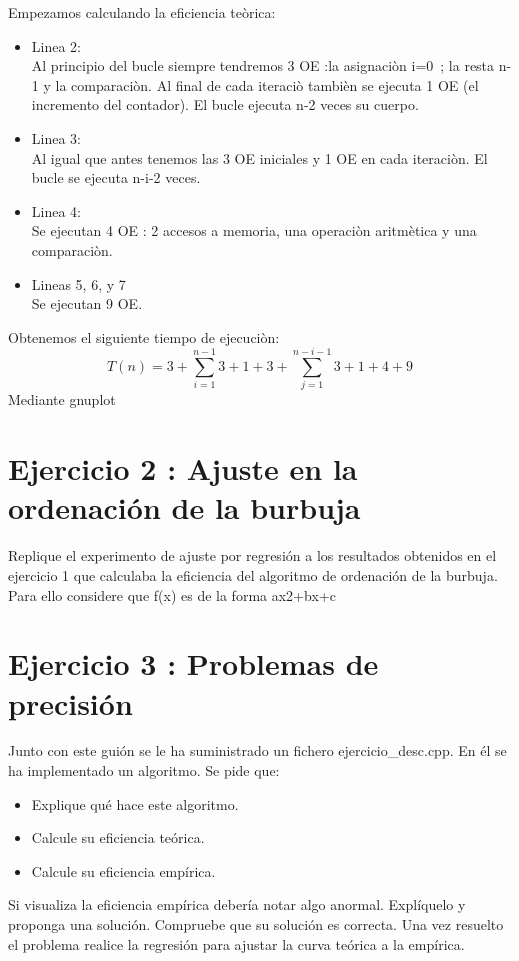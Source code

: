 \documentclass{article}
\begin{document}
Empezamos calculando la eficiencia te\`orica:
\begin{itemize}
	\item Linea 2: \\ Al principio del bucle siempre tendremos 3 OE :la asignaci\`on i=0\ ; la resta  n-1 y la comparaci\`on. Al final de cada iteraci\`o tambi\`en se ejecuta 1 OE (el incremento del contador). El bucle ejecuta n-2 veces su cuerpo.
	\item Linea 3: \\ Al igual que antes tenemos las 3 OE iniciales y 1 OE en cada iteraci\`on. El bucle se ejecuta n-i-2 veces.
	\item Linea 4: \\ Se ejecutan 4 OE : 2 accesos a memoria, una operaci\`on aritm\`etica y una comparaci\`on.
	\item Lineas 5, 6, y 7 \\  Se ejecutan 9 OE.
\end{itemize}
	Obtenemos el siguiente tiempo de ejecuci\`on: 
	\begin{equation}
		T(n)= 3 + \sum\limits_{i=1}^{n-1}{3+1+3+\sum\limits_{j=1}^{n-i-1}{3+1+4+9}}
	\end{equation}
	Mediante gnuplot
	
\clearpage
\section{Ejercicio 2 : Ajuste en la ordenación de la burbuja}
Replique el experimento de ajuste por regresión a los resultados obtenidos en el ejercicio 1 que calculaba la eficiencia del algoritmo de ordenación de la burbuja. Para ello considere que f(x) es de la forma ax2+bx+c

\clearpage
\section{Ejercicio 3 : Problemas de precisión}
Junto con este guión se le ha suministrado un fichero ejercicio\_desc.cpp. En él se ha implementado un algoritmo. Se pide que:
\begin{itemize}
	\item Explique qué hace este algoritmo.
	\item Calcule su eficiencia teórica.
	\item Calcule su eficiencia empírica.
\end{itemize}
Si visualiza la eficiencia empírica debería notar algo anormal. Explíquelo y proponga una solución. Compruebe que su solución es correcta. Una vez resuelto el problema realice la regresión para ajustar la curva teórica a la empírica.
\end{document}
